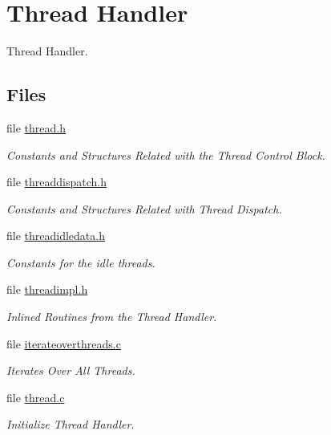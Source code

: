 \hypertarget{group__RTEMSScoreThread}{}\section{Thread Handler}
\label{group__RTEMSScoreThread}


Thread Handler.  


\subsection*{Files}
\begin{DoxyCompactItemize}
\item 
file \mbox{\hyperlink{score_2thread_8h}{thread.\+h}}
\begin{DoxyCompactList}\small\item\em Constants and Structures Related with the Thread Control Block. \end{DoxyCompactList}\item 
file \mbox{\hyperlink{threaddispatch_8h}{threaddispatch.\+h}}
\begin{DoxyCompactList}\small\item\em Constants and Structures Related with Thread Dispatch. \end{DoxyCompactList}\item 
file \mbox{\hyperlink{threadidledata_8h}{threadidledata.\+h}}
\begin{DoxyCompactList}\small\item\em Constants for the idle threads. \end{DoxyCompactList}\item 
file \mbox{\hyperlink{threadimpl_8h}{threadimpl.\+h}}
\begin{DoxyCompactList}\small\item\em Inlined Routines from the Thread Handler. \end{DoxyCompactList}\item 
file \mbox{\hyperlink{iterateoverthreads_8c}{iterateoverthreads.\+c}}
\begin{DoxyCompactList}\small\item\em Iterates Over All Threads. \end{DoxyCompactList}\item 
file \mbox{\hyperlink{thread_8c}{thread.\+c}}
\begin{DoxyCompactList}\small\item\em Initialize Thread Handler. \end{DoxyCompactList}\item 

\end{DoxyCompactItemize}
